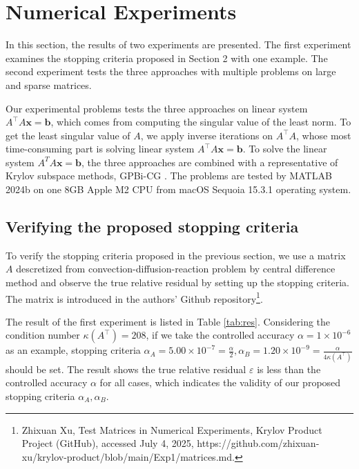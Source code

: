 \section{Numerical Experiments}\label{sec:abbr}

In this section, the results of two experiments are presented. The first experiment examines the stopping criteria proposed in Section 2 with one example. The second experiment tests the three approaches with multiple problems on large and sparse matrices.
\par

Our experimental problems tests the three approaches on linear system $A^\top A\boldsymbol{x}=\boldsymbol{b}$, which comes from computing the singular value of the least
norm. To get the least singular value of $A$, we apply inverse iterations on $A^{\top}A$, whose most time-consuming part is solving linear system $A^{\top}A\boldsymbol{x}=\boldsymbol{b}$. To solve the linear system $A^TA\boldsymbol{x}=\boldsymbol{b}$, the three approaches are combined with a representative of Krylov subspace methods, GPBi-CG \cite{ZH97}. The problems are tested by MATLAB 2024b on one 8GB Apple M2 CPU from macOS Sequoia 15.3.1
operating system. 
\subsection{Verifying the proposed stopping criteria}
To verify the stopping criteria proposed in the previous section, we use a matrix $A$ descretized from convection-diffusion-reaction problem by central difference method and observe the true relative residual by setting up the stopping criteria. The matrix is introduced in the authors' Github repository\footnote{Zhixuan Xu, Test Matrices in Numerical Experiments, Krylov Product Project (GitHub), accessed July 4, 2025, https://github.com/zhixuan-xu/krylov-product/blob/main/Exp1/matrices.md.}.
\par
The result of the first experiment is listed in Table \ref{tab:res}. Considering the condition number $\kappa(A^\top)= 208$, if we take the controlled accuracy $ \alpha = 1 \times  10^{-6}$ as an example, stopping criteria $ \alpha_A = 5.00 \times 10^{-7} = \frac{\alpha}{2} , \alpha_B = 1.20 \times  10^{-9} = \frac{ \alpha}{4\kappa(A^\top)} $ should be set. The result shows the true relative residual $ \varepsilon$ is less than the controlled accuracy $\alpha$ for all cases, which indicates the validity of our proposed stopping criteria $\alpha_A,\alpha_B$.
\par

